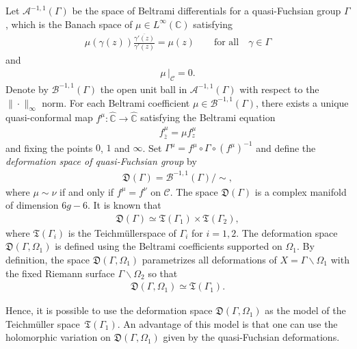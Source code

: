 \documentclass[pdftex]{sigma}%
\numberwithin{equation}{section}
\newcommand{\Te}{Teichm\"{u}ller\:}
\begin{document}
Let $\mathcal{A}^{-1,1}(\Gamma)$ be the space of Beltrami differentials for a quasi-Fuchsian group $\Gamma$, which is the Banach space of $\mu\in L^\infty(\mathbb{C})$ satisfying
\begin{gather*}
\mu(\gamma(z)) \frac{\overline{\gamma'(z)}}{\gamma'(z)} =\mu(z) \qquad \text{for all}\quad \gamma\in\Gamma
\end{gather*}
and
\begin{gather*}
\mu\, \big|_{\mathcal{C}} =0.
\end{gather*}
Denote by $\mathcal{B}^{-1,1}(\Gamma)$ the open unit ball in $\mathcal{A}^{-1,1}(\Gamma)$ with respect to the $\|\cdot\|_{\infty}$ norm. For each Beltrami coefficient
$\mu\in\mathcal{B}^{-1,1}(\Gamma)$, there exists a unique quasi-conformal map $f^\mu\colon\hat{\mathbb{C}} \to \hat{\mathbb{C}}$ satisfying the Beltrami equation
\begin{gather}\label{e:beltrami-eq}
f^\mu_{\bar{z}} =\mu f^\mu_z
\end{gather}
and fixing the points $0$, $1$ and $\infty$. Set $\Gamma^\mu= f^\mu \circ \Gamma\circ (f^\mu)^{-1}$ and define the \emph{deformation space of quasi-Fuchsian group} by
\begin{gather*}
\mathfrak{D}(\Gamma) =\mathcal{B}^{-1,1}(\Gamma)/ {\sim},
\end{gather*}
where $\mu\sim \nu$ if and only if $f^\mu=f^\nu$ on $\mathcal{C}$. The space $\mathfrak{D}(\Gamma)$ is a complex manifold of dimension $6g-6$. It is known that
\begin{gather*}%
\mathfrak{D}(\Gamma) \simeq \mathfrak{T}(\Gamma_1)\times {\mathfrak{T}}(\Gamma_2),
\end{gather*}
where $\mathfrak{T}(\Gamma_i)$ is the \Te space of $\Gamma_i$ for $i=1,2$.
The deformation space $\mathfrak{D}(\Gamma,\Omega_1)$ is defined using the Beltrami coefficients supported on $\Omega_1$. By definition,
the space $\mathfrak{D}(\Gamma,\Omega_1)$ parametrizes all deformations of $X=\Gamma\backslash \Omega_1$ with the fixed Riemann surface $\Gamma\backslash \Omega_2$ so that
\begin{gather*}
\mathfrak{D}(\Gamma,\Omega_1) \simeq \mathfrak{T}(\Gamma_1).
\end{gather*}
{\sloppy Hence, it is possible to use the deformation space $\mathfrak{D}(\Gamma,\Omega_1)$ as the model of the Teichm\"{u}ller space~$\mathfrak{T}(\Gamma_1)$.
An advantage of this model is that one can use the holomorphic variation on $\mathfrak{D}(\Gamma,\Omega_1)$ given by the quasi-Fuchsian deformations.

}
\end{document}
